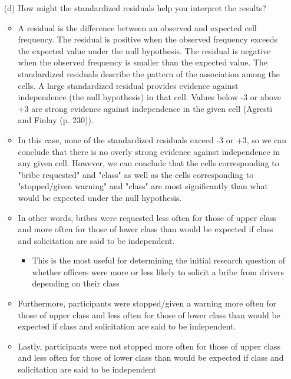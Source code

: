 \documentclass[12pt,letterpaper]{article}
\begin{document}
\begin{enumerate}
		
	\vspace{0cm}
	\item [(d)] How might the standardized residuals help you interpret the results?  
		\begin{itemize}
			\item A residual is the difference between an observed and expected cell frequency. The residual is positive when the observed frequency exceeds the expected value under the null hypothesis. The residual is negative when the observed frequency is smaller than the expected value. The standardized residuals describe the pattern of the association among the cells. A large standardized residual provides evidence against independence (the null hypothesis) in that cell. Values below -3 or above +3 are strong evidence against independence in the given cell (Agresti and Finlay (p. 230)).
			\item In this case, none of the standardized residuals exceed -3 or +3, so we can conclude that there is no overly strong evidence against independence in any given cell. However, we can conclude that the cells corresponding to "bribe requested" and "class" as well as the cells corresponding to "stopped/given warning" and "class" are most significantly than what would be expected under the null hypothesis.
			\item In other words, bribes were requested less often for those of upper class and more often for those of lower class than would be expected if class and solicitation are said to be independent.
				\begin{itemize}
					\item This is the most useful for determining the initial research question of whether officers were more or less likely to solicit a bribe from drivers depending on their class
				\end{itemize}
			\item Furthermore, participants were stopped/given a warning more often for those of upper class and less often for those of lower class than would be expected if class and solicitation are said to be independent.
			\item Lastly, participants were not stopped more often for those of upper class and less often for those of lower class than would be expected if class and solicitation are said to be independent
		\end{itemize}
	
\end{enumerate}
\newpage
\end{document}

